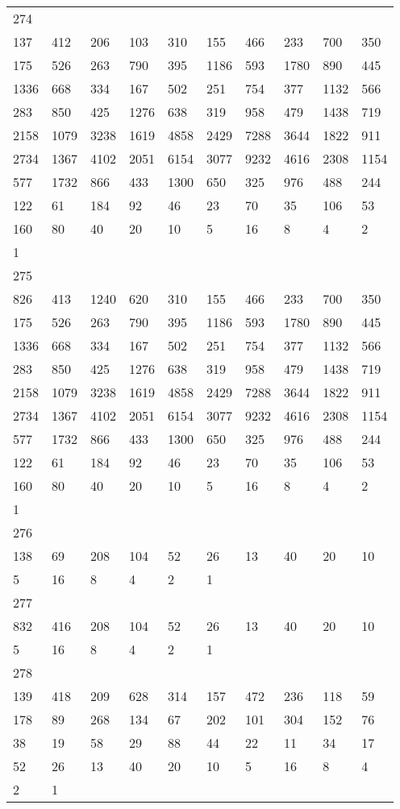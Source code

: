 \begin{longtable}{*{10}{l}}
274&&&&&&&&&\\
137& 412& 206& 103& 310& 155& 466& 233& 700& 350\\
175& 526& 263& 790& 395& 1186& 593& 1780& 890& 445\\
1336& 668& 334& 167& 502& 251& 754& 377& 1132& 566\\
283& 850& 425& 1276& 638& 319& 958& 479& 1438& 719\\
2158& 1079& 3238& 1619& 4858& 2429& 7288& 3644& 1822& 911\\
2734& 1367& 4102& 2051& 6154& 3077& 9232& 4616& 2308& 1154\\
577& 1732& 866& 433& 1300& 650& 325& 976& 488& 244\\
122& 61& 184& 92& 46& 23& 70& 35& 106& 53\\
160& 80& 40& 20& 10& 5& 16& 8& 4& 2\\
1& \\

275&&&&&&&&&\\
826& 413& 1240& 620& 310& 155& 466& 233& 700& 350\\
175& 526& 263& 790& 395& 1186& 593& 1780& 890& 445\\
1336& 668& 334& 167& 502& 251& 754& 377& 1132& 566\\
283& 850& 425& 1276& 638& 319& 958& 479& 1438& 719\\
2158& 1079& 3238& 1619& 4858& 2429& 7288& 3644& 1822& 911\\
2734& 1367& 4102& 2051& 6154& 3077& 9232& 4616& 2308& 1154\\
577& 1732& 866& 433& 1300& 650& 325& 976& 488& 244\\
122& 61& 184& 92& 46& 23& 70& 35& 106& 53\\
160& 80& 40& 20& 10& 5& 16& 8& 4& 2\\
1& \\

276&&&&&&&&&\\
138& 69& 208& 104& 52& 26& 13& 40& 20& 10\\
5& 16& 8& 4& 2& 1& \\

277&&&&&&&&&\\
832& 416& 208& 104& 52& 26& 13& 40& 20& 10\\
5& 16& 8& 4& 2& 1& \\

278&&&&&&&&&\\
139& 418& 209& 628& 314& 157& 472& 236& 118& 59\\
178& 89& 268& 134& 67& 202& 101& 304& 152& 76\\
38& 19& 58& 29& 88& 44& 22& 11& 34& 17\\
52& 26& 13& 40& 20& 10& 5& 16& 8& 4\\
2& 1& \\


\end{longtable}
